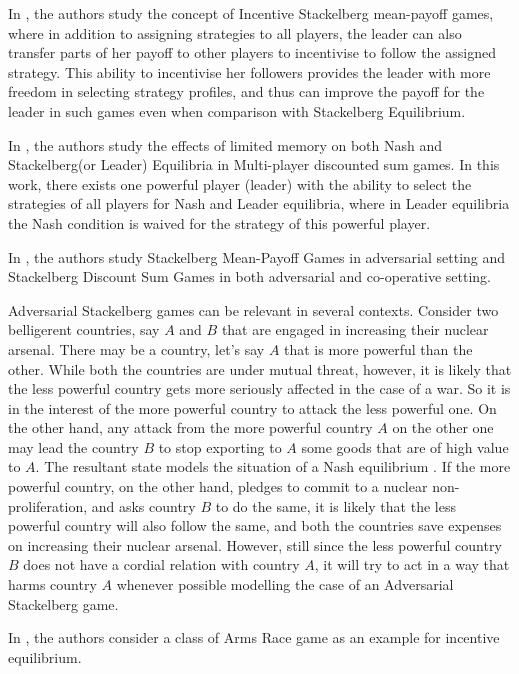 In \cite{GSTDP16}, the authors study the concept of Incentive Stackelberg mean-payoff games, where in addition to assigning strategies to all players, the leader can also transfer parts of her payoff to other players to incentivise to follow the assigned strategy. This ability to incentivise her followers provides the leader with more freedom in selecting strategy profiles, and thus can improve the payoff for the leader in such games even when comparison with Stackelberg Equilibrium.

In \cite{GS15}, the authors study the effects of limited memory on both Nash and Stackelberg(or Leader) Equilibria in Multi-player discounted sum games. In this work, there exists one powerful player (leader) with the ability to select the strategies of all players for Nash and Leader equilibria, where in Leader equilibria the Nash condition is waived for the strategy of this powerful player.

In \cite{FGR20}, the authors study Stackelberg Mean-Payoff Games in adversarial setting and  Stackelberg Discount Sum Games in both adversarial and co-operative setting.

Adversarial Stackelberg games can be relevant in several contexts. Consider two belligerent countries, say $A$ and $B$ that are engaged in increasing their nuclear arsenal. There may be a country, let's say $A$ that is more powerful than the other. While both the countries are under mutual threat, however, it is likely that the less powerful country gets more seriously affected in the case of a war. So it is in the interest of the more powerful country to attack the less powerful one. On the other hand, any attack from the more powerful country $A$ on the other one may lead the country $B$ to stop exporting to $A$ some goods that are of high value to $A$. The resultant state models the situation of a Nash equilibrium . If the more powerful country, on the other hand, pledges to commit to a nuclear non-proliferation, and asks country $B$ to do the same, it is likely that the less powerful country will also follow the same, and both the countries save expenses on increasing their nuclear arsenal. However, still since the less powerful country $B$ does not have a cordial relation with country $A$, it will try to act in a way that harms  country $A$ whenever possible modelling the case of an Adversarial Stackelberg game.

In \cite{GS18}, the authors consider a class of Arms Race game as an example for incentive equilibrium.


